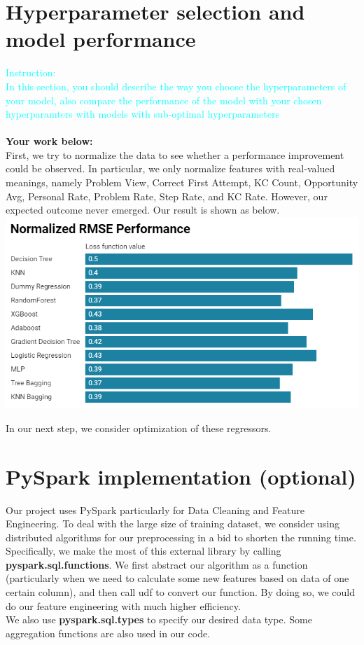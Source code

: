 \documentclass{article}
\begin{document}
\section{Hyperparameter selection and model performance}
\textcolor{cyan}{Instruction: \\
In this section, you should describe the way you choose the hyperparameters of your model, also compare the performance of the model with your chosen hyperparamters with models with sub-optimal hyperparameters}\\\\
\textbf{Your work below:}\\
First, we try to normalize the data to see whether a performance improvement could be observed.
In particular, we only normalize features with real-valued meanings, namely Problem View, Correct First Attempt, KC Count, Opportunity Avg, 
Personal Rate, Problem Rate, Step Rate, and KC Rate. However, our expected outcome never emerged. Our result is shown as below.\\
\includegraphics[width=1\linewidth]{normalized.png}

In our next step, we consider optimization of these regressors.


\section{PySpark implementation (optional)}
Our project uses PySpark particularly for Data Cleaning and Feature Engineering. To deal with the large size of training dataset,
we consider using distributed algorithms for our preprocessing in a bid to shorten the running time.\\
Specifically, we make the most of this external library by calling \textbf{pyspark.sql.functions}. We first abstract our algorithm as a function
(particularly when we need to calculate some new features based on data of one certain column), and then call udf to convert our function.
By doing so, we could do our feature engineering with much higher efficiency.\\
We also use \textbf{pyspark.sql.types} to specify our desired data type.
Some aggregation functions are also used in our code.
\end{document}

